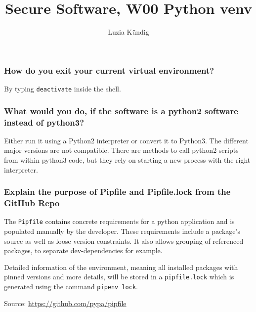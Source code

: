 \documentclass[11pt, a4paper]{article}
\title{Secure Software, W00 Python venv}
\author{Luzia Kündig}
\begin{document}
\maketitle

\subsubsection*{How do you exit your current virtual environment?}

By typing \verb|deactivate| inside the shell.

\subsubsection*{What would you do, if the software is a python2 software instead of python3?}

Either run it using a Python2 interpreter or convert it to Python3. The different major versions are not compatible. There are methods to call python2 scripts from within python3 code, but they rely on starting a new process with the right interpreter.

\subsubsection*{Explain the purpose of Pipfile and Pipfile.lock from the GitHub Repo}

The \verb|Pipfile| contains concrete requirements for a python application and is populated manually by the developer. These requirements include a package's source as well as loose version constraints. It also allows grouping of referenced packages, to separate dev-dependencies for example. 

Detailed information of the environment, meaning all installed packages with pinned versions and more details, will be stored in a \verb|pipfile.lock| which is generated using the command \verb|pipenv lock|.

Source: \url{https://github.com/pypa/pipfile}
\end{document}
